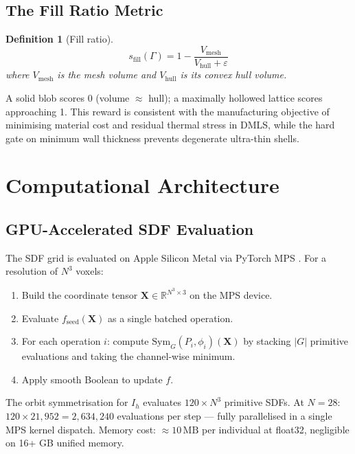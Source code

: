 \documentclass[11pt, a4paper]{article}
\newtheorem{definition}{Definition}[section]
\newcommand{\R}{\mathbb{R}}
\newcommand{\card}[1]{\lvert #1 \rvert}
\newcommand{\Ih}{I_h}
\begin{document}
\subsection{The Fill Ratio Metric}

\begin{definition}[Fill ratio]
\[
  s_{\mathrm{fill}}(\Gamma) = 1 - \frac{V_{\mathrm{mesh}}}{V_{\mathrm{hull}} + \varepsilon}
\]
where $V_{\mathrm{mesh}}$ is the mesh volume and $V_{\mathrm{hull}}$ is its
convex hull volume.
\end{definition}

A solid blob scores 0 (volume $\approx$ hull); a maximally hollowed lattice
scores approaching 1. This reward is consistent with the manufacturing
objective of minimising material cost and residual thermal stress in DMLS,
while the hard gate on minimum wall thickness prevents degenerate ultra-thin shells.

\section{Computational Architecture}
\label{sec:compute}

\subsection{GPU-Accelerated SDF Evaluation}

The SDF grid is evaluated on Apple Silicon Metal via PyTorch MPS
\cite{apple_mps}. For a resolution of $N^3$ voxels:

\begin{enumerate}
  \item Build the coordinate tensor $\mathbf{X} \in \R^{N^3 \times 3}$ on the MPS device.
  \item Evaluate $f_{\mathrm{seed}}(\mathbf{X})$ as a single batched operation.
  \item For each operation $i$: compute $\mathrm{Sym}_G(P_i, \phi_i)(\mathbf{X})$ by stacking
        $\card{G}$ primitive evaluations and taking the channel-wise minimum.
  \item Apply smooth Boolean to update $f$.
\end{enumerate}

The orbit symmetrisation for $\Ih$ evaluates $120 \times N^3$ primitive SDFs.
At $N=28$: $120 \times 21{,}952 = 2{,}634{,}240$ evaluations per step — fully
parallelised in a single MPS kernel dispatch. Memory cost: $\approx 10\,\mathrm{MB}$
per individual at float32, negligible on 16+ GB unified memory.
\end{document}
